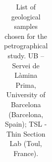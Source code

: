 \documentclass[
  a4paper,
  DIV=11,
  numbers=noendperiod]{scrreprt}
\begin{document}
\begin{longtable}[]{@{}
  >{\raggedright\arraybackslash}p{}
  >{\raggedright\arraybackslash}p{}
  >{\raggedright\arraybackslash}p{}
  >{\raggedright\arraybackslash}p{}
  >{\raggedright\arraybackslash}p{}
  >{\raggedright\arraybackslash}p{}
  >{\raggedright\arraybackslash}p{}@{}}

\caption{\label{tbl-frames-petrolist}List of geological samples chosen
for the petrographical study. UB -- Servei de Làmina Prima, University
of Barcelona (Barcelona, Spain); TSL - Thin Section Lab (Toul, France).}

\tabularnewline


\end{longtable}
\end{document}
